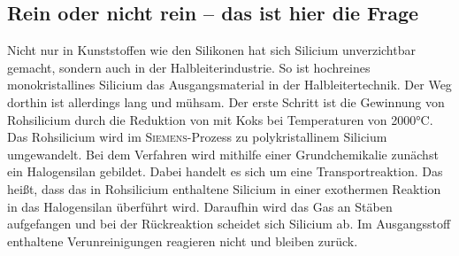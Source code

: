 \documentclass[../kl10.tex]{subfiles}
\begin{document}
\subsection{Rein oder nicht rein – das ist hier die Frage} 
Nicht nur in Kunststoffen wie den Silikonen hat sich Silicium unverzichtbar gemacht, sondern auch in der Halbleiterindustrie. So ist hochreines monokristallines Silicium das Ausgangsmaterial in der Halbleitertechnik. Der Weg dorthin ist allerdings lang und mühsam. 
Der erste Schritt ist die Gewinnung von Rohsilicium durch die Reduktion von  mit Koks bei Temperaturen von 2000\thinspace°C. 
Das Rohsilicium wird im \textsc{Siemens}-Prozess zu polykristallinem Silicium umgewandelt. Bei dem Verfahren wird mithilfe einer Grundchemikalie zunächst ein Halogensilan gebildet. 
Dabei handelt es sich um eine Transportreaktion. Das heißt, dass das in Rohsilicium enthaltene Silicium in einer exothermen Reaktion in das Halogensilan überführt wird. Daraufhin wird das Gas an Stäben aufgefangen und bei der Rückreaktion scheidet sich Silicium ab. Im Ausgangsstoff enthaltene Verunreinigungen reagieren nicht und bleiben zurück. 

\newpage
\end{document}
